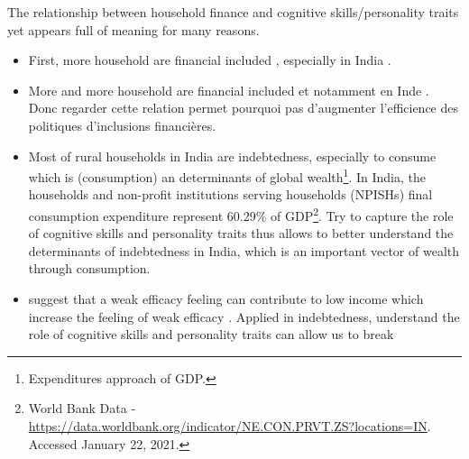 \documentclass[a4paper, 11pt, onecolumn]{article}
\begin{document}
The relationship between household finance and cognitive skills/personality traits yet appears full of meaning for many reasons.
\begin{itemize}

\item First, more household are financial included \citep{Badarinza2019}, especially in India \citep{Chakravartya2013}.


\item More and more household are financial included \citep{Badarinza2019} et notamment en Inde .
Donc regarder cette relation permet pourquoi pas d'augmenter l'efficience des politiques d'inclusions financières.

\item Most of rural households in India are indebtedness, especially to consume which is (consumption) an determinants of global wealth\footnote{Expenditures approach of GDP.}.
In India, the households and non-profit institutions serving households (NPISHs) final consumption expenditure represent 60.29\% of GDP\footnote{World Bank Data - \url{https://data.worldbank.org/indicator/NE.CON.PRVT.ZS?locations=IN}. Accessed January 22, 2021.}.
Try to capture the role of cognitive skills and personality traits thus allows to better understand the determinants of indebtedness in India, which is an important vector of wealth through consumption. 

\item \cite{Fong2001} suggest that a weak efficacy feeling can contribute to low income which increase the feeling of weak efficacy \citep{Bowles2001}. 
Applied in indebtedness, understand the role of cognitive skills and personality traits can allow us to break 

\end{itemize}
\end{document}

